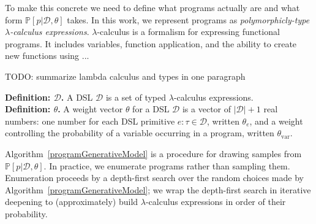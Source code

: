 \documentclass{article}
\newcommand{\probability}{\mathds{P}} %
\begin{document}
To make this concrete we need to define what programs actually are and
what form $\probability[p |\mathcal{D},\theta]$ takes.
In this work, we represent programs as \emph{polymorphicly-type $\lambda$-calculus expressions}.
$\lambda$-calculus is a formalism for expressing functional programs.
It includes variables, function application, and the ability to create new functions using ...

TODO: summarize lambda calculus and types in one paragraph

\noindent\textbf{Definition: $\mathcal{D}$.}
A DSL $\mathcal{D}$ is a set of typed $\lambda$-calculus expressions.
\\\noindent\textbf{Definition: $\theta$.}
A weight vector $\theta$ for a DSL $\mathcal{D}$ is a vector of $|\mathcal{D}| + 1$ real numbers:
one number for each DSL primitive $e:\tau\in \mathcal{D}$, written $\theta_e$,
and a weight controlling the probability of a variable occurring in a program, written $\theta_{\text{var}}$.

Algorithm~\ref{programGenerativeModel} is a procedure for drawing
samples from $\probability[p|\mathcal{D},\theta]$.  In practice, we
enumerate programs rather than sampling them.  Enumeration proceeds by
a depth-first search over the random choices made by
Algorithm~\ref{programGenerativeModel}; we wrap the depth-first search
in iterative deepening to (approximately) build $\lambda$-calculus
expressions in order of their probability.
\end{document}
